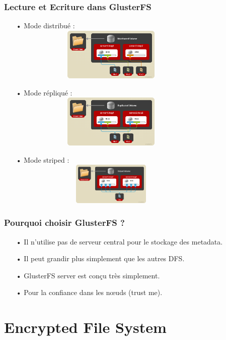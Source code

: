 \documentclass[10pt,a4paper]{beamer}
\begin{document}
\begin{frame}
  \frametitle{Lecture et Ecriture dans GlusterFS}

\begin{itemize}
\item[•] Mode distribué :\\
\includegraphics[width=10cm,height=2.5cm]{1.png}
\item[•] Mode répliqué :\\
\includegraphics[width=10cm,height=2.5cm]{2.png}
\item[•] Mode striped :\\
\includegraphics[width=10cm,height=2cm]{3.png}
\end{itemize}
\end{frame}

\begin{frame}
  \frametitle{Pourquoi choisir GlusterFS ?}

\begin{itemize}
\item[•] Il n'utilise pas de serveur central pour le stockage des metadata.\vfill
\item[•] Il peut grandir plus simplement que les autres DFS.\vfill
\item[•] GlusterFS server est conçu très simplement.\vfill
\item[•] Pour la confiance dans les nœuds (trust me).
\end{itemize}
\end{frame}

\section{Encrypted File System}
\end{document}

